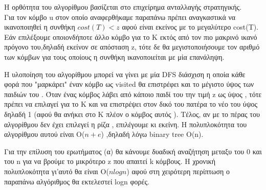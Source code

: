 \documentclass[12pt,a4paper]{article}
\begin{document}
Η ορθότητα του αλγορίθμου βασίζεται στο επιχείρημα ανταλλαγής στρατηγικής. \\
Για τον κόμβο u στον οποίο αναφερθήκαμε   παραπάνω πρέπει αναγκαστικά να ικανοποιηθεί η συνθήκη
$cost(T) < z$ αφού είναι εκείνος με το μεγαλύτερο cost(T). Εάν επιλέξουμε οποιονδήποτε άλλο κόμβο για το Κ εκτός από τον πιο μακρινό ικανό πρόγονο του,δηλαδή εκείνον σε απόσταση z, τότε δε θα μεγιστοποιήσουμε τον αριθμό των κόμβων για τους οποίους η συνθήκη ικανοποιείται με μία επανάληψη. \par
Η υλοποίηση του αλγορίθμου μπορεί να γίνει με μία DFS διάσχιση η οποία κάθε φορά που "μαρκάρει" έναν κόμβο ως visited θα επιστρέφει και το μέγιστο ύψος των παιδιών του . Όταν ένας κόμβος λάβει από κάποιο παιδί του την τιμή z ως ύψος , τότε πρέπει να επιλαγεί για το Κ και να επιστρέψει στον δικό του πατέρα το νέο του ύψος δηλαδή 1 (αφού θα ανήκει στο Κ πλέον ο κόμβος αυτός ). Τέλος, αν με το πέρας του αλγορίθμου δεν έχει επιλεγεί η ρίζα , επιλέγουμε κι εκείνη. Η πολυπλοκότητα του αλγορίθμου αυτού είναι O($n + e$) ,δηλαδή λόγω binary tree Ο(n). \par
Για την επίλυση του ερωτήματος (α) θα κάνουμε δυαδική αναζήτηση μεταξυ του 0 και του n για να βρούμε το μικρότερο z που απαιτεί k κόμβους. Η χρονική πολυπλοκότητα γι'αυτό θα είναι Ο($nlogn$) αφού στη χειρότερη περίπτωση ο παραπάνω αλγόριθμος θα εκτελεστεί logn φορές. 
\end{document}
